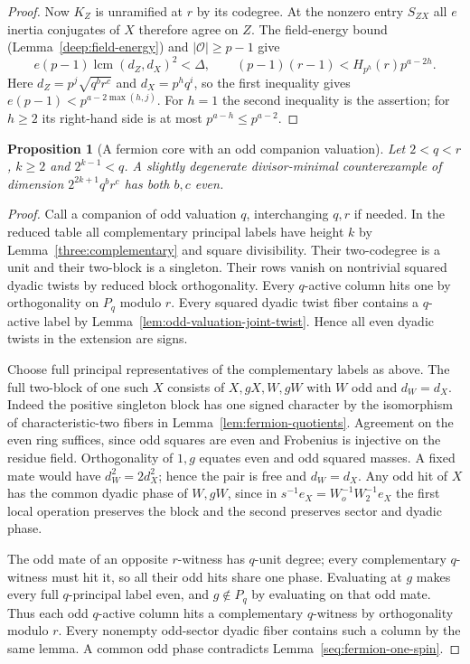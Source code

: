 \documentclass[11pt,a4paper]{article}
\numberwithin{equation}{section}
\newtheorem{proposition}[theorem]{Proposition}
\theoremstyle{remark}
\newcommand{\lcm}{\operatorname{lcm}}
\begin{document}
\begin{proof}
Now $K_Z$ is unramified at $r$ by its codegree. At the nonzero
entry $S_{ZX}$ all $e$ inertia conjugates of $X$ therefore agree
on $Z$. The field-energy bound (Lemma~\ref{deep:field-energy})
and $|\mathcal O|\ge p-1$ give
\[
 e(p-1)\lcm(d_Z,d_X)^2<\Delta,\qquad
 (p-1)(r-1)< H_{p^h}(r)p^{a-2h}.
\]
Here $d_Z=p^j\sqrt{q^b r^c}$ and $d_X=p^h q^i$, so the first
inequality gives $e(p-1)<p^{a-2\max(h,j)}$. For $h=1$ the
second inequality is the assertion; for $h\ge2$ its right-hand
side is at most $p^{a-h}\le p^{a-2}$.
\end{proof}

\begin{proposition}[A fermion core with an odd companion valuation]\label{fam:M:7.10}
\label{seq:reduceddyadic5}
Let $2<q<r$, $k\ge2$ and $2^{k-1}<q$. A slightly degenerate divisor-minimal counterexample of dimension $2^{2k+1}q^b r^c$ has both $b,c$ even.
\end{proposition}

\begin{proof}
Call a companion of odd valuation $q$, interchanging $q,r$ if needed. In the reduced table all complementary principal labels have height $k$ by Lemma~\ref{three:complementary} and square divisibility. Their two-codegree is a unit and their two-block is a singleton. Their rows vanish on nontrivial squared dyadic twists by reduced block orthogonality. Every $q$-active column hits one by orthogonality on $P_q$ modulo $r$. Every squared dyadic twist fiber contains a $q$-active label by Lemma~\ref{lem:odd-valuation-joint-twist}. Hence all even dyadic twists in the extension are signs.

Choose full principal representatives of the complementary labels as above. The full two-block of one such $X$ consists of $X,gX,W,gW$ with $W$ odd and $d_W=d_X$. Indeed the positive singleton block has one signed character by the isomorphism of characteristic-two fibers in Lemma~\ref{lem:fermion-quotients}. Agreement on the even ring suffices, since odd squares are even and Frobenius is injective on the residue field. Orthogonality of $1,g$ equates even and odd squared masses. A fixed mate would have $d_W^2=2d_X^2$; hence the pair is free and $d_W=d_X$. Any odd hit of $X$ has the common dyadic phase of $W,gW$, since in $s^{-1}e_X=W_o^{-1}W_2^{-1}e_X$ the first local operation preserves the block and the second preserves sector and dyadic phase.

The odd mate of an opposite $r$-witness has $q$-unit degree; every complementary $q$-witness must hit it, so all their odd hits share one phase. Evaluating at $g$ makes every full $q$-principal label even, and $g\notin P_q$ by evaluating on that odd mate. Thus each odd $q$-active column hits a complementary $q$-witness by orthogonality modulo $r$. Every nonempty odd-sector dyadic fiber contains such a column by the same lemma. A common odd phase contradicts Lemma~\ref{seq:fermion-one-spin}.
\end{proof}
\end{document}
